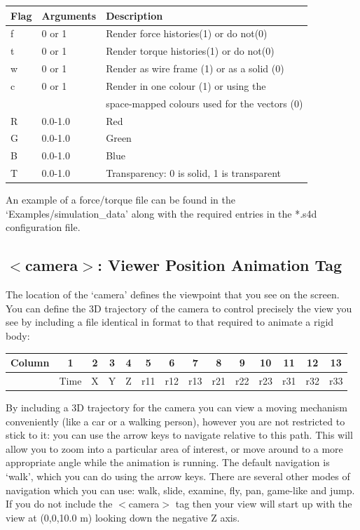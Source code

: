\documentclass[singlecolumn,12pt]{article}
\begin{document}
\begin{tabular}{l l l}
\hline Flag & Arguments  & Description \\
\hline f & 0 or 1 & Render force histories(1) or do not(0)\\
t & 0 or 1 & Render torque histories(1) or do not(0)\\
w & 0 or 1 & Render as wire frame (1) or as a solid (0) \\
c & 0 or 1 & Render in one colour (1) or using the \\
  &        & space-mapped colours used for the vectors (0)\\
R & 0.0-1.0 & Red \\
G & 0.0-1.0 & Green \\
B & 0.0-1.0 & Blue \\
T & 0.0-1.0 & Transparency: 0 is solid, 1 is transparent\\
\end{tabular}

An example of a force/torque file can be found in the
`Examples/simulation\_data' along with the required entries in the
*.s4d configuration file.

\subsection{$<$camera$>$: Viewer Position Animation Tag}

The location of the `camera' defines the viewpoint that you see on
the screen. You can define the 3D trajectory of the camera to
control precisely the view you see by including a file identical in
format to that required to animate a rigid body:

\vspace{1cm}
\begin{center}
\begin{tabular}{c|c|c|c|c|c|c|c|c|c|c|c|c|c|}
\hline Column & 1 & 2 & 3 & 4 & 5 & 6 & 7 & 8 & 9 & 10 & 11 & 12 & 13 \\
\hline & Time & X & Y & Z & r11 & r12 & r13 & r21 & r22 & r23 & r31
& r32 &
r33 \\
\end{tabular}
\end{center}
\vspace{1cm}

By including a 3D trajectory for the camera you can view a moving
mechanism conveniently (like a car or a walking person), however you
are not restricted to stick to it: you can use the arrow keys to
navigate relative to this path. This will allow you to zoom into a
particular area of interest, or move around to a more appropriate
angle while the animation is running. The default navigation is
`walk', which you can do using the arrow keys. There are several
other modes of navigation which you can use: walk, slide, examine,
fly, pan, game-like and jump. If you do not include the $<$camera$>$
tag then your view will start up with the view at (0,0,10.0 m)
looking down the negative Z axis.
\end{document}

